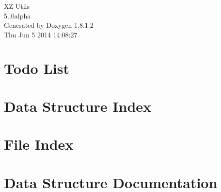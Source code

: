 \documentclass{book}
\begin{document}
\begin{titlepage}
\vspace*{7cm}
\begin{center}
{\Large X\-Z Utils \\[1ex]\large 5..\-0alpha }\\
\vspace*{1cm}
{\large Generated by Doxygen 1.8.1.2}\\
\vspace*{0.5cm}
{\small Thu Jun 5 2014 14:08:27}\\
\end{center}
\end{titlepage}
\clearemptydoublepage
{}
\tableofcontents
\clearemptydoublepage
{}
\chapter{Todo List}
\label{todo}

\chapter{Data Structure Index}

\chapter{File Index}

\chapter{Data Structure Documentation}















































\end{document}
